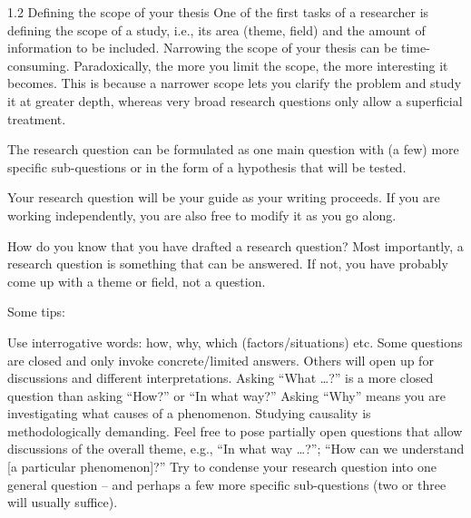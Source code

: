 1.2 Defining the scope of your thesis
One of the first tasks of a researcher is defining the scope of a study, i.e., its area (theme, field) and the amount of information to be included. Narrowing the scope of your thesis can be time-consuming. Paradoxically, the more you limit the scope, the more interesting it becomes. This is because a narrower scope lets you clarify the problem and study it at greater depth, whereas very broad research questions only allow a superficial treatment.

The research question can be formulated as one main question with (a few) more specific sub-questions or in the form of a hypothesis that will be tested.

Your research question will be your guide as your writing proceeds. If you are working independently, you are also free to modify it as you go along.

How do you know that you have drafted a research question? Most importantly, a research question is something that can be answered. If not, you have probably come up with a theme or field, not a question.

Some tips:

Use interrogative words: how, why, which (factors/situations) etc.
Some questions are closed and only invoke concrete/limited answers. Others will open up for discussions and different interpretations.
Asking “What …?” is a more closed question than asking “How?” or “In what way?”
Asking “Why” means you are investigating what causes of a phenomenon. Studying causality is methodologically demanding.
Feel free to pose partially open questions that allow discussions of the overall theme, e.g., “In what way …?”; “How can we understand [a particular phenomenon]?”
Try to condense your research question into one general question – and perhaps a few more specific sub-questions (two or three will usually suffice).